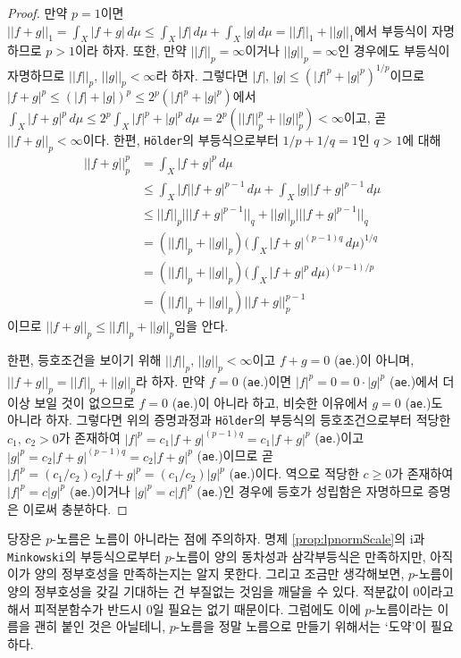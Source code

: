 \begin{proof}
    만약 $p=1$이면 $||f+g||_1=\int_X|f+g|\,d\mu\leq\int_X|f|\,d\mu+\int_X|g|\,d\mu=||f||_1+||g||_1$에서 부등식이 자명하므로 $p>1$이라 하자. 또한, 만약 $||f||_p=\infty$이거나 $||g||_p=\infty$인 경우에도 부등식이 자명하므로 $||f||_p,\,||g||_p<\infty$라 하자. 그렇다면 $|f|,\,|g|\leq(|f|^p+|g|^p)^{1/p}$이므로 $|f+g|^p\leq(|f|+|g|)^p\leq2^p(|f|^p+|g|^p)$에서 $\int_X|f+g|^p\,d\mu\leq2^p\int_X|f|^p+|g|^p\,d\mu=2^p(||f||_p^p+||g||_p^p)<\infty$이고, 곧 $||f+g||_p<\infty$이다. 한편, \texttt{H\"older}의 부등식으로부터 $1/p+1/q=1$인 $q>1$에 대해
    \begin{align*}
        ||f+g||_p^p&=\int_X|f+g|^p\,d\mu\\
        &\leq\int_X|f||f+g|^{p-1}\,d\mu+\int_X|g||f+g|^{p-1}\,d\mu\\
        &\leq||f||_p|||f+g|^{p-1}||_q+||g||_p|||f+g|^{p-1}||_q\\
        &=(||f||_p+||g||_p)\bigg(\int_X|f+g|^{(p-1)q}\,d\mu\bigg)^{1/q}\\
        &=(||f||_p+||g||_p)\bigg(\int_X|f+g|^p\,d\mu\bigg)^{(p-1)/p}\\
        &=(||f||_p+||g||_p)||f+g||_p^{p-1}
    \end{align*}
    이므로 $||f+g||_p\leq||f||_p+||g||_p$임을 안다.

    한편, 등호조건을 보이기 위해 $||f||_p,\,||g||_p<\infty$이고 $f+g=0$ (\texttt{ae}.)이 아니며, $||f+g||_p=||f||_p+||g||_p$라 하자. 만약 $f=0$ (\texttt{ae}.)이면 $|f|^p=0=0\cdot|g|^p$ (\texttt{ae}.)에서 더 이상 보일 것이 없으므로 $f=0$ (\texttt{ae}.)이 아니라 하고, 비슷한 이유에서 $g=0$ (\texttt{ae}.)도 아니라 하자. 그렇다면 위의 증명과정과 \texttt{H\"older}의 부등식의 등호조건으로부터 적당한 $c_1,\,c_2>0$가 존재하여 $|f|^p=c_1|f+g|^{(p-1)q}=c_1|f+g|^p$ (\texttt{ae}.)이고 $|g|^p=c_2|f+g|^{(p-1)q}=c_2|f+g|^p$ (\texttt{ae}.)이므로 곧 $|f|^p=(c_1/c_2)c_2|f+g|^p=(c_1/c_2)|g|^p$ (\texttt{ae}.)이다. 역으로 적당한 $c\geq0$가 존재하여 $|f|^p=c|g|^p$ (\texttt{ae}.)이거나 $|g|^p=c|f|^p$ (\texttt{ae}.)인 경우에 등호가 성립함은 자명하므로 증명은 이로써 충분하다.
\end{proof}

당장은 $p$-노름은 노름이 아니라는 점에 주의하자. 명제 \ref{prop:lpnormScale}의 i과 \texttt{Minkowski}의 부등식으로부터 $p$-노름이 양의 동차성과 삼각부등식은 만족하지만, 아직 이가 양의 정부호성을 만족하는지는 알지 못한다. 그리고 조금만 생각해보면, $p$-노름이 양의 정부호성을 갖길 기대하는 건 부질없는 것임을 깨달을 수 있다. 적분값이 0이라고 해서 피적분함수가 반드시 0일 필요는 없기 때문이다. 그럼에도 이에 $p$-노름이라는 이름을 괜히 붙인 것은 아닐테니, $p$-노름을 정말 노름으로 만들기 위해서는 `도약'이 필요하다.

